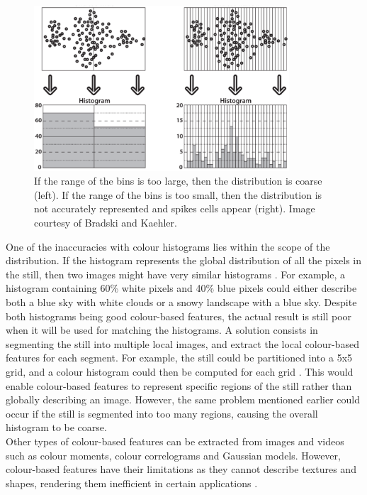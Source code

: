 \begin{figure}[h]
\centerline{\includegraphics[width=0.85\textwidth]{figures/histogram_bin_size.png}}
\caption{\label{fig:histogram-bin-size}If the range of the bins is too large, then the distribution is coarse (left). If the range of the bins is too small, then the distribution is not accurately represented and spikes cells appear (right). Image courtesy of Bradski and Kaehler.}
\end{figure}

One of the inaccuracies with colour histograms lies within the scope of the distribution. If the histogram represents the global distribution of all the pixels in the still, then two images might have very similar histograms \cite{petkovic2000}. For example, a histogram containing 60\% white pixels and 40\% blue pixels could either describe both a blue sky with white clouds or a snowy landscape with a blue sky. Despite both histograms being good colour-based features, the actual result is still poor when it will be used for matching the histograms. A solution consists in segmenting the still into multiple local images, and extract the local colour-based features for each segment. For example, the still could be partitioned into a 5x5 grid, and a colour histogram could then be computed for each grid \cite{yan2007review}. This would enable colour-based features to represent specific regions of the still rather than globally describing an image. However, the same problem mentioned earlier could occur if the still is segmented into too many regions, causing the overall histogram to be coarse.\\

Other types of colour-based features can be extracted from images and videos such as colour moments, colour correlograms \cite{huang1997correlograms} and Gaussian models. However, colour-based features have their limitations as they cannot describe textures and shapes, rendering them inefficient in certain applications \cite{hu2011survey}.

